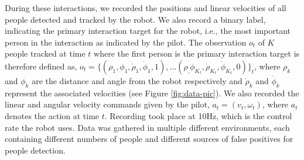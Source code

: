 \documentclass[letterpaper, 10 pt, conference]{ieeeconf}
\begin{document}
During these interactions, we recorded the positions and linear velocities of all people detected and tracked by the robot. We also record a binary label, indicating the primary interaction target for the robot, i.e., the most important person in the interaction as indicated by the pilot. The observation $o_t$ of $K$ people tracked at time $t$ where the first person is the primary interaction target is therefore defined as, $o_t = \{(\rho_1,\phi_1,\dot{\rho}_1,\dot{\phi}_1,1),... (\rho_,\phi_{K_t},\dot{\rho}_{K_t},\dot{\phi}_{K_t},0)\}_t$, where $\rho_k$ and $\phi_k$ are the distance and angle from the robot respectively and $\dot{\rho}_k$ and $\dot{\phi}_k$ represent the associated velocities (see Figure \ref{fig:data-pic}). We also recorded the linear and angular velocity commands given by the pilot, $a_t = (v_t,\omega_t)$, where $a_t$ denotes the action at time $t$. Recording took place at 10Hz, which is the control rate the robot uses. Data was gathered in multiple different environments, each containing different numbers of people and different sources of false positives for people detection.
\end{document}
